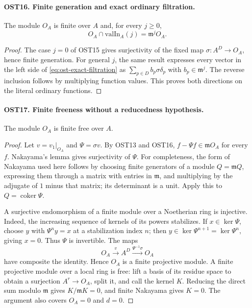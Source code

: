 \documentclass[11pt,a4paper]{article}
\numberwithin{equation}{section}
\theoremstyle{remark}\newtheorem{remark}[theorem]{Remark}
\begin{document}
\paragraph{OST16. Finite generation and exact ordinary filtration.}
\label{claim:OST16}
The module $O_A$ is finite over $A$ and, for every $j\geq0$,
\begin{equation}\label{eq:ost-exact-filtration}
                     O_A\cap\mathrm{valIn}_A(j)=\mathfrak m^jO_A.
\end{equation}
\begin{proof}
The case $j=0$ of OST15 gives surjectivity of the fixed map
$\sigma:A^D\to O_A$, hence finite generation.  For general
$j$, the same result expresses every vector in the left side
of \eqref{eq:ost-exact-filtration} as
$\sum_{p\in D}b_p\sigma\delta_p$ with $b_p\in\mathfrak m^j$.
The reverse inclusion follows by multiplying function values.
This proves both directions on the literal ordinary functions.
\end{proof}

\paragraph{OST17. Finite freeness without a reducedness hypothesis.}
\label{claim:OST17}
The module $O_A$ is finite free over $A$.
\begin{proof}
Let $v=v_1|_{O_A}$ and $\Psi=\sigma v$.  By OST13 and OST16,
$f-\Psi f\in\mathfrak mO_A$ for every $f$.  Nakayama's
lemma gives surjectivity of $\Psi$.  For completeness, the
form of Nakayama used here follows by choosing finite generators
of a module $Q=\mathfrak mQ$, expressing them through a matrix
with entries in $\mathfrak m$, and multiplying by the adjugate
of $1$ minus that matrix; its determinant is a unit.  Apply
this to $Q=\operatorname{coker}\Psi$.

A surjective endomorphism of a finite module over a Noetherian
ring is injective.  Indeed, the increasing sequence of kernels
of its powers stabilizes.  If $x\in\ker\Psi$, choose $y$
with $\Psi^ny=x$ at a stabilization index $n$; then
$y\in\ker\Psi^{n+1}=\ker\Psi^n$, giving $x=0$.
Thus $\Psi$ is invertible.  The maps
\[
 O_A\xrightarrow{v}A^D
       \xrightarrow{\Psi^{-1}\sigma}O_A
\]
have composite the identity.  Hence $O_A$ is a finite
projective module.  A finite projective module over a local
ring is free: lift a basis of its residue space to obtain
a surjection $A^r\to O_A$, split it, and call the kernel
$K$.  Reducing the direct sum modulo $\mathfrak m$ gives
$K/\mathfrak mK=0$, and finite Nakayama gives $K=0$.
The argument also covers $O_A=0$ and $d=0$.
\end{proof}
\end{document}

